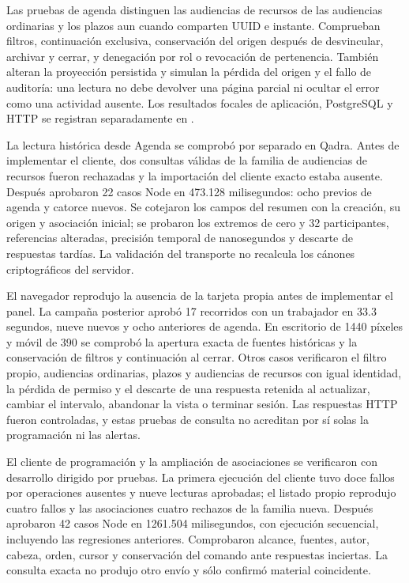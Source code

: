 Las pruebas de agenda distinguen las audiencias de recursos de las audiencias ordinarias y los plazos aun cuando comparten UUID e instante. Comprueban filtros, continuación exclusiva, conservación del origen después de desvincular, archivar y cerrar, y denegación por rol o revocación de pertenencia. También alteran la proyección persistida y simulan la pérdida del origen y el fallo de auditoría: una lectura no debe devolver una página parcial ni ocultar el error como una actividad ausente. Los resultados focales de aplicación, PostgreSQL y HTTP se registran separadamente en .

La lectura histórica desde Agenda se comprobó por separado en Qadra. Antes de implementar el cliente, dos consultas válidas de la familia de audiencias de recursos fueron rechazadas y la importación del cliente exacto estaba ausente. Después aprobaron 22 casos Node en 473.128 milisegundos: ocho previos de agenda y catorce nuevos. Se cotejaron los campos del resumen con la creación, su origen y asociación inicial; se probaron los extremos de cero y 32 participantes, referencias alteradas, precisión temporal de nanosegundos y descarte de respuestas tardías. La validación del transporte no recalcula los cánones criptográficos del servidor.

El navegador reprodujo la ausencia de la tarjeta propia antes de implementar el panel. La campaña posterior aprobó 17 recorridos con un trabajador en 33.3 segundos, nueve nuevos y ocho anteriores de agenda. En escritorio de 1440 píxeles y móvil de 390 se comprobó la apertura exacta de fuentes históricas y la conservación de filtros y continuación al cerrar. Otros casos verificaron el filtro propio, audiencias ordinarias, plazos y audiencias de recursos con igual identidad, la pérdida de permiso y el descarte de una respuesta retenida al actualizar, cambiar el intervalo, abandonar la vista o terminar sesión. Las respuestas HTTP fueron controladas, y estas pruebas de consulta no acreditan por sí solas la programación ni las alertas.

El cliente de programación y la ampliación de asociaciones se verificaron con desarrollo dirigido por pruebas. La primera ejecución del cliente tuvo doce fallos por operaciones ausentes y nueve lecturas aprobadas; el listado propio reprodujo cuatro fallos y las asociaciones cuatro rechazos de la familia nueva. Después aprobaron 42 casos Node en 1261.504 milisegundos, con ejecución secuencial, incluyendo las regresiones anteriores. Comprobaron alcance, fuentes, autor, cabeza, orden, cursor y conservación del comando ante respuestas inciertas. La consulta exacta no produjo otro envío y sólo confirmó material coincidente.

